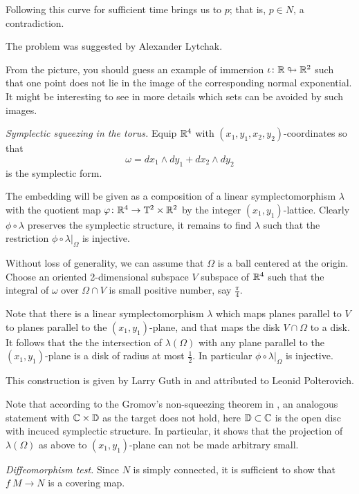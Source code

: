 Following this curve for sufficient time brings us to $p$;
that is, $p\in N$, a contradiction.

The problem was suggested by Alexander Lytchak.

From the picture, you should guess an example of immersion 
$\iota\colon\mathbb{R}\looparrowright\mathbb{R}^2$ 
such that one point does not lie in the image of the corresponding normal exponential.
It might be interesting to see in more details 
which sets can be avoided by such images.



\textit{Symplectic squeezing in the torus.}
Equip $\mathbb{R}^4$ with $(x_1,y_1,x_2,y_2)$-coordinates
so that 
\[\omega=dx_1\wedge dy_1+dx_2\wedge dy_2\]
is the symplectic form. 

The embedding will be given as a composition of a linear symplectomorphism $\lambda$ 
with the quotient map $\varphi\colon\mathbb{R}^4\to \mathbb{T}^2\times\mathbb{R}^2$ by the integer $(x_1,y_1)$-lattice.
Clearly $\phi\circ\lambda$ preserves the symplectic structure,
it remains to find $\lambda$ such that the restriction $\phi\circ\lambda|_\Omega$
is injective.

Without loss of generality,
we can assume that $\Omega$ is a ball centered at the origin.
Choose an oriented 2-dimensional subspace $V$ subspace of $\mathbb{R}^4$ 
such that the integral of $\omega$ over 
$\Omega\cap V$ is small positive number, say $\tfrac\pi4$. 

Note that there is a linear symplectomorphism $\lambda$
 which maps planes parallel to $V$ to planes
parallel to the $(x_1,y_1)$-plane, 
and that maps the disk $V\cap\Omega$ to a disk.
It follows that the the intersection of $\lambda(\Omega)$ 
with any plane parallel to the $(x_1,y_1)$-plane is a disk of radius at most $\tfrac 12$.
In particular $\phi\circ\lambda|_\Omega$
is injective.

This construction is given 
by Larry Guth in \cite{guth-symplectic}
and attributed to Leonid Polterovich.

Note that according to the Gromov's non-squeezing theorem in \cite{gromov-pseudoholomorphic}, 
an analogous statement with $\mathbb{C}\times \mathbb{D}$ as the target does not hold, here $\mathbb{D}\subset \mathbb{C}$ is the open disc with incuced symplectic structure.
In particular, it shows that
the projection of $\lambda(\Omega)$ as above 
to $(x_1,y_1)$-plane
can not be made arbitrary small.

\textit{Diffeomorphism test.}
Since $N$ is simply connected, 
it is sufficient to show that $f\:M\to N$ is a covering map.

